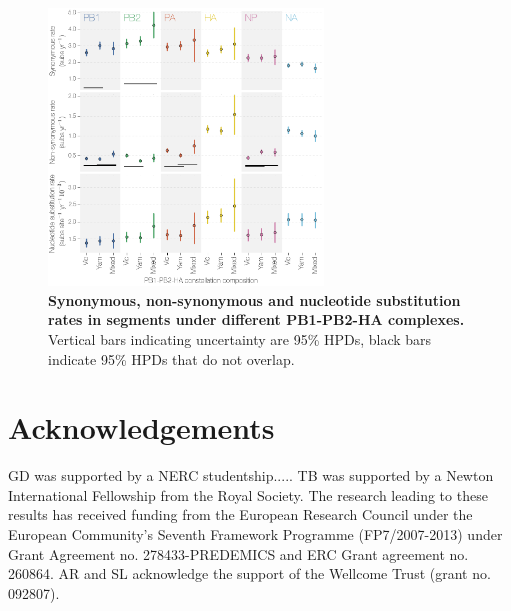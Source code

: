 \documentclass[11pt,oneside,letterpaper]{article}
\begin{document}
\begin{figure}
\centering  
\includegraphics[width=0.65\textwidth]  {supp_figures/InfB_robustCounting.png}
\caption{\textbf{Synonymous, non-synonymous and nucleotide substitution rates in segments under different PB1-PB2-HA complexes.}
Vertical bars indicating uncertainty are 95\% HPDs, black bars indicate 95\% HPDs that do not overlap.}
\label{robustCounting}
\end{figure}

\section*{Acknowledgements}
GD was supported by a NERC studentship..... 
TB was supported by a Newton International Fellowship from the Royal Society. 
The research leading to these results has received funding from the European Research Council under the European Community's Seventh Framework Programme (FP7/2007-2013) under Grant Agreement no. 278433-PREDEMICS and ERC Grant agreement no. 260864.
AR and SL acknowledge the support of the Wellcome Trust (grant no. 092807).



\end{document}
